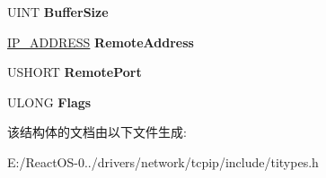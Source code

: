 \begin{DoxyCompactItemize}
U\+I\+NT {\bfseries Buffer\+Size}
\item 
\mbox{\label{struct___d_a_t_a_g_r_a_m___s_e_n_d___r_e_q_u_e_s_t_acd7c402ac9d8fc21c383d044a99f2677}} 
\hyperlink{struct_i_p___a_d_d_r_e_s_s}{I\+P\+\_\+\+A\+D\+D\+R\+E\+SS} {\bfseries Remote\+Address}
\item 
\mbox{\label{struct___d_a_t_a_g_r_a_m___s_e_n_d___r_e_q_u_e_s_t_ae15a1f9644c65f38caa06670beaa55c2}} 
U\+S\+H\+O\+RT {\bfseries Remote\+Port}
\item 
\mbox{\label{struct___d_a_t_a_g_r_a_m___s_e_n_d___r_e_q_u_e_s_t_a6a2df7207c90dba8fc72985284b15a15}} 
U\+L\+O\+NG {\bfseries Flags}
\end{DoxyCompactItemize}


该结构体的文档由以下文件生成\+:\begin{DoxyCompactItemize}
\item 
E\+:/\+React\+O\+S-\/0../drivers/network/tcpip/include/titypes.\+h\end{DoxyCompactItemize}
